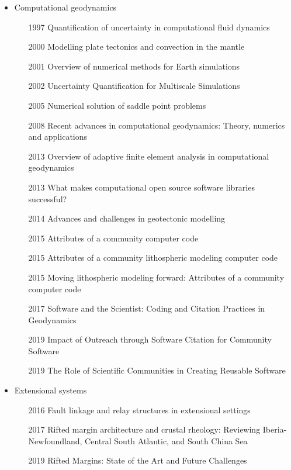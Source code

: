 \begin{itemize}
\item Computational geodynamics
   \begin{itemize}
   \item [1997] Quantification of uncertainty in computational fluid dynamics \cite{roac97}
   \item [2000] Modelling plate tectonics and convection in the mantle \cite{mogz00}
   \item [2001] Overview of numerical methods for Earth simulations \cite{momd01}
   \item [2002] Uncertainty Quantification for Multiscale Simulations \cite{degg02}
   \item [2005] Numerical solution of saddle point problems \cite{begl05}
   \item [2008] Recent advances in computational geodynamics: Theory, numerics and applications \cite{kags08}
   \item [2013] Overview of adaptive finite element analysis in computational geodynamics \cite{masm13}
   \item [2013] What makes computational open source software libraries successful? \cite{bahe13}
   \item [2014] Advances and challenges in geotectonic modelling \cite{bufy14}
   \item [2015] Attributes of a community computer code \cite{comc15}
   \item [2015] Attributes of a community lithospheric modeling computer code \cite{comc15}
   \item [2015] Moving lithospheric modeling forward: Attributes of a community computer code \cite{comc15}
   \item [2017] Software and the Scientist: Coding and Citation Practices in Geodynamics \cite{hwfs17}
   \item [2019] Impact of Outreach through Software Citation for Community Software \cite{hwpc19}
   \item [2019] The Role of Scientific Communities in Creating Reusable Software \cite{kehg19}
   \end{itemize}

\item Extensional systems
   \begin{itemize}
   \item [2016] Fault linkage and relay structures in extensional settings \cite{foro16}
   \item [2017] Rifted margin architecture and crustal rheology: Reviewing 
                Iberia-Newfoundland, Central South Atlantic, and South China Sea \cite{brhc17}
   \item [2019] Rifted Margins: State of the Art and Future Challenges \cite{pema19}\\
   \end{itemize}


\end{itemize}
